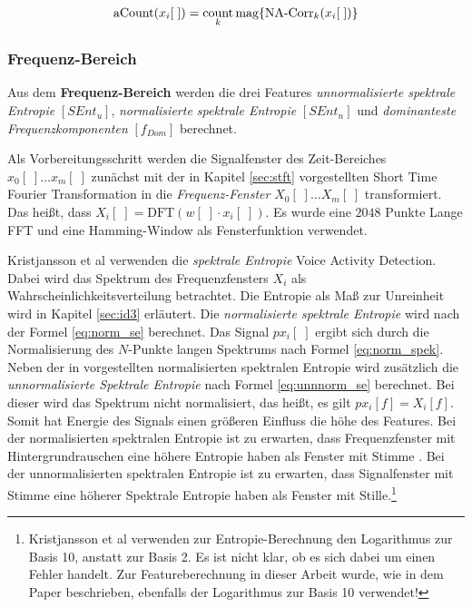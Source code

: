 \begin{equation}
\text{aCount}(x_i[\;]) = \operatorname*{count}_{k}\text{mag}\{\text{NA-Corr}_k(x_i[\;])\}
\label{eq:corrcount}
\end{equation}



\subsubsection{Frequenz-Bereich}

Aus dem \textbf{Frequenz-Bereich} werden die drei Features \emph{unnormalisierte spektrale Entropie} $[SEnt_{u}]$, \emph{normalisierte spektrale Entropie}  $[SEnt_{n}]$ und \emph{dominanteste Frequenzkomponenten} $[f_{Dom}]$ berechnet. 

Als Vorbereitungsschritt werden die Signalfenster des Zeit-Bereiches $x_0[\;] \ldots x_m[\;]$ zunächst mit der in Kapitel \ref{sec:stft} vorgestellten Short Time Fourier Transformation in die \emph{Frequenz-Fenster} \label{eq:stft} $X_0[\;] \ldots X_m[\;]$ transformiert. Das heißt, dass $X_i[\;] = \text{DFT}(w[\;] \cdot x_i[\;])$. Es wurde eine $2048$ Punkte Lange FFT und eine Hamming-Window als Fensterfunktion verwendet.

Kristjansson et al \cite[S. 2]{vad_Lisboa} verwenden die \emph{spektrale Entropie} Voice Activity Detection. Dabei wird das Spektrum des Frequenzfensters $X_i$ als Wahrscheinlichkeitsverteilung betrachtet. Die Entropie als Maß zur \glqq Unreinheit\grqq{} wird in Kapitel \ref{sec:id3} erläutert. Die \emph{normalisierte spektrale Entropie} wird nach der Formel \ref{eq:norm_se} berechnet. Das Signal $px_i[\;]$ ergibt sich durch die Normalisierung des $N$-Punkte langen Spektrums nach Formel \ref{eq:norm_spek}. Neben der in \cite{vad_Lisboa} vorgestellten normalisierten spektralen Entropie wird zusätzlich die \emph{unnormalisierte Spektrale Entropie} nach Formel \ref{eq:unnnorm_se} berechnet. Bei dieser wird das Spektrum nicht normalisiert, das heißt, es gilt $px_i[f] = X_i[f]$. Somit hat Energie des Signals einen größeren Einfluss die höhe des Features. Bei der normalisierten spektralen Entropie ist zu erwarten, dass Frequenzfenster mit Hintergrundrauschen eine höhere Entropie haben als Fenster mit Stimme . Bei der unnormalisierten spektralen Entropie ist zu erwarten, dass Signalfenster mit Stimme eine höherer Spektrale Entropie haben als Fenster mit Stille.\footnote{Kristjansson et al \cite[S. 2]{vad_Lisboa} verwenden zur Entropie-Berechnung den Logarithmus zur Basis 10, anstatt zur Basis 2. Es ist nicht klar, ob es sich dabei um einen Fehler handelt. Zur Featureberechnung in dieser Arbeit wurde, wie in dem Paper beschrieben, ebenfalls der Logarithmus zur Basis 10 verwendet!}

